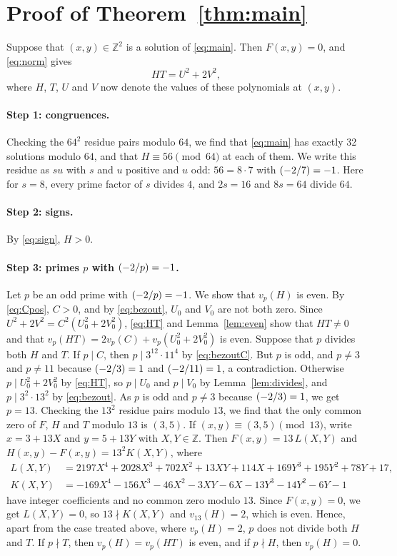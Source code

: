 \documentclass[11pt]{article}
\newcommand{\Z}{\mathbb{Z}}
\newcommand{\leg}[2]{\mathchoice{\biggl(\dfrac{#1}{#2}\biggr)}{(#1/#2)}{(#1/#2)}{(#1/#2)}}
\begin{document}
\section{Proof of Theorem~\ref{thm:main}}

Suppose that $(x,y)\in\Z^2$ is a solution of \eqref{eq:main}. Then $F(x,y)=0$, and \eqref{eq:norm} gives
\begin{equation}\label{eq:HT}
HT=U^2+2V^2,
\end{equation}
where $H$, $T$, $U$ and $V$ now denote the values of these polynomials at $(x,y)$.

\paragraph{Step 1: congruences.} Checking the $64^2$ residue pairs modulo $64$, we find that \eqref{eq:main} has exactly 32 solutions modulo $64$, and that $H\equiv56\pmod{64}$ at each of them. We write this residue as $su$ with $s$ and $u$ positive and $u$ odd: $56=8\cdot7$ with $\leg{-2}{7}=-1$. Here for $s=8$, every prime factor of $s$ divides $4$, and $2s=16$ and $8s=64$ divide $64$.

\paragraph{Step 2: signs.} By \eqref{eq:sign}, $H>0$.

\paragraph{\texorpdfstring{Step 3: primes $p$ with $\leg{-2}{p}=-1$.}{Step 3: inert primes.}} Let $p$ be an odd prime with $\leg{-2}{p}=-1$. We show that $v_p(H)$ is even. By \eqref{eq:Cpos}, $C>0$, and by \eqref{eq:bezout}, $U_0$ and $V_0$ are not both zero. Since $U^2+2V^2=C^2(U_0^2+2V_0^2)$, \eqref{eq:HT} and Lemma~\ref{lem:even} show that $HT\neq0$ and that $v_p(HT)=2v_p(C)+v_p(U_0^2+2V_0^2)$ is even. Suppose that $p$ divides both $H$ and $T$. If $p\mid C$, then $p\mid 3^{12}\cdot 11^{4}$ by \eqref{eq:bezoutC}. But $p$ is odd, and $p\neq3$ and $p\neq11$ because $\leg{-2}{3}=1$ and $\leg{-2}{11}=1$, a contradiction. Otherwise $p\mid U_0^2+2V_0^2$ by \eqref{eq:HT}, so $p\mid U_0$ and $p\mid V_0$ by Lemma~\ref{lem:divides}, and $p\mid 3^{2}\cdot 13^{2}$ by \eqref{eq:bezout}. As $p$ is odd and $p\neq3$ because $\leg{-2}{3}=1$, we get $p=13$. Checking the $13^2$ residue pairs modulo $13$, we find that the only common zero of $F$, $H$ and $T$ modulo $13$ is $(3,5)$. If $(x,y)\equiv(3,5)\pmod{13}$, write $x=3+13X$ and $y=5+13Y$ with $X,Y\in\Z$. Then $F(x,y)=13\,L(X,Y)$ and $H(x,y)-F(x,y)=13^2K(X,Y)$, where
\begin{align*}
L(X,Y)&=2197X^{4}+2028X^{3}+702X^{2}+13XY+114X+169Y^{3}+195Y^{2}+78Y+17,\\
K(X,Y)&=-169X^{4}-156X^{3}-46X^{2}-3XY-6X-13Y^{3}-14Y^{2}-6Y-1
\end{align*}
have integer coefficients and no common zero modulo $13$. Since $F(x,y)=0$, we get $L(X,Y)=0$, so $13\nmid K(X,Y)$ and $v_{13}(H)=2$, which is even. Hence, apart from the case treated above, where $v_p(H)=2$, $p$ does not divide both $H$ and $T$. If $p\nmid T$, then $v_p(H)=v_p(HT)$ is even, and if $p\nmid H$, then $v_p(H)=0$.
\end{document}
